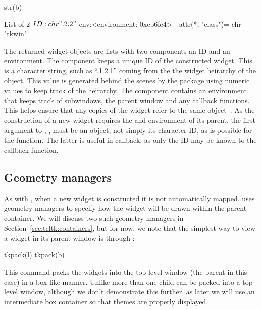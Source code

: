 \begin{Schunk}
\begin{Sinput}
 str(b)
\end{Sinput}
\begin{Soutput}
List of 2
 $ ID : chr ".2.2"
 $ env:<environment: 0xcb6fe4> 
 - attr(*, "class")= chr "tkwin"
\end{Soutput}
\end{Schunk}

The returned widget objects are lists with two components an ID and an
environment. The  component keeps a unique ID of the
constructed widget. This is a character string, such as ``.1.2.1''
coming from the the widget heirarchy of the object. This value is
generated behind the scenes by the  package using numeric
values to keep track of the heirarchy. The  component
contains an environment that keeps track of subwindows, the parent
window and any callback functions. This helps ensure that any copies
of the widget refer to the same object~\citep{Dalgaard-DSC}. As the
construction of a new widget requires the  and environment of
its parent, the first argument to , ,
must be an \R\/ \TK\/ object, not simply its character ID, as is
possible for the  function. The latter is useful in
callback, as only the ID may be known to the callback function.


\subsection{Geometry managers}
\label{sec:tcltk:overview:geometry-managers}

As with \GTK, when a new widget is constructed it is not automatically mapped. \TK\/ uses geometry managers to specify how the widget will be drawn within the parent container. We will discuss two such geometry managers in Section~\ref{sec:tcltk:containers}, but for now, we note that the simplest way to view a widget in its parent window is through :
\begin{Schunk}
\begin{Sinput}
 tkpack(l)
 tkpack(b)
\end{Sinput}
\end{Schunk}

This command packs the widgets into the top-level window (the parent
in this case) in a box-like manner. Unlike \GTK\/ more than one child
can be packed into a top-level window, although we don't demonstrate
this further, as later we will use an intermediate 
box container so that themes are properly displayed.

